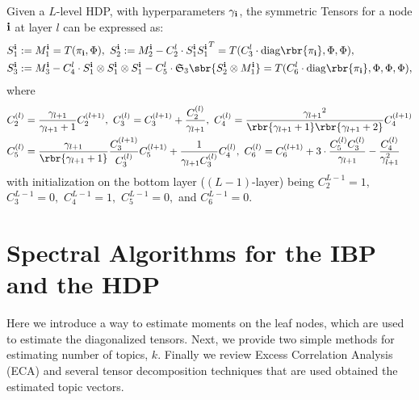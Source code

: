 \documentclass[twoside,11pt]{article}
\newcommand{\symm}{\mathfrak{S}}
\newcommand{\ib}{{\bf i}}
\begin{document}
{\vspace{-2mm}
\begin{lemma}
  \label{lem:hdp3moments_general}
Given a $L$-level HDP, with hyperparameters $\gamma_{\ib}$, the symmetric Tensors for a node $\ib$ at layer $l$ can be expressed as:
\begin{align*}
   	 S_1^{\ib} &:= M_1^{\ib} = T(\pi_{\ib}, \Phi ),\,\, S_2^{\ib} := M_2^{\ib} - C_2^{l} \cdot S_1^{\ib} {S_1^{\ib}}^T = T( C_3^{l} \cdot \mathrm{diag}\rbr{\pi_{\ib} }, \Phi,\Phi),\\
	S_3^{\ib} & :=  M_3^{\ib} - C_4^{l}  \cdot S_1^{\ib} \otimes S_1^{\ib} \otimes S_1^{\ib} -C_5^{l}  \cdot \symm_3\sbr{ S_2^{\ib} \otimes M_1^{\ib}}= T(  C_6^{l} \cdot  \mathrm{diag}\rbr{\pi_{\ib}}, \Phi,\Phi,\Phi),
  \end{align*}
where
\begin{align}
C_2^{(l)} &= \frac{\gamma_{l+1} }{ \gamma_{l+1} +1 } C_2^{(l+1)},\,\, C_3^{(l)} =  C_3^{(l+1)} + \frac{C_2^{(l)}}{\gamma_{l+1} }, \,\,C_4^{(l)} = \frac{{\gamma_{l+1}}^2  }{ \rbr{\gamma_{l+1} +1}\rbr{\gamma_{l+1} +2} }  C_4^{(l+1)} \nonumber\\
C_5^{(l)} &= \frac{\gamma_{l+1} }{ \rbr{\gamma_{l+1} +1} } \frac{C_3^{(l+1)}}{C_3^{(l)}} C_5^{(l+1)} + \frac{1}{\gamma_{l+1}C_3^{(l)}}C_4^{(l)}, \,\,C_6^{(l)} = C_6^{(l+1)} +  3 \cdot \frac{ C_5^{(l)}C_3^{(l)}}{\gamma_{l+1}} - \frac{C_4^{(l)}}{\gamma_{l+1}^2} \nonumber
\end{align}
with initialization on the bottom layer ($(L - 1)$-layer) being $C_2^{L-1} = 1, $ $C_3^{L-1} =0 ,$ $C_4^{L-1} =1 ,$ $C_5^{L-1} =0,$
and $C_6^{L-1} = 0.$
\end{lemma}
%



%

\section{Spectral Algorithms for the IBP and the HDP}
\vspace{-2mm}
\label{sec:alg}
Here we introduce a way to estimate moments on the leaf nodes, which 
are used to estimate the diagonalized tensors.  
Next, we provide two simple methods for estimating number of topics, $k.$ 
Finally we review Excess Correlation Analysis (ECA) and several tensor 
decomposition techniques that are used obtained the estimated topic vectors.
}
\end{document}
